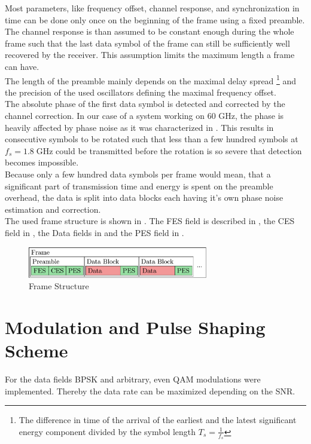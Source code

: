 Most parameters, like frequency offset, channel response, and
synchronization in time can be done only once on the beginning of the
frame using a fixed preamble.
The channel response is than assumed to be constant enough during
the whole frame such that the last data symbol of the frame can still be
sufficiently well recovered by the receiver.
This assumption limits the maximum length a frame can have. \\

The length of the preamble mainly depends on the maximal delay spread%
\footnote{The difference in time of the arrival of the earliest and the
  latest significant energy component divided by the symbol length
  $T_s = \frac{1}{f_s}$} and the precision of the used oscillators defining
the maximal frequency offset. \\

The absolute phase of the first data symbol is detected and corrected by the
channel correction. In our case of a system working on 60 GHz, the
phase is heavily affected by phase noise as it was characterized in
\cite{radoslav}. This results in consecutive symbols to be
rotated such that less than a few hundred symbols at $f_s = 1.8 \;\text{GHz}$
could be transmitted before the rotation is so severe that detection
becomes impossible. \\

Because only a few hundred data symbols per frame would mean,
that a significant part of transmission time and energy is spent
on the preamble overhead, the data is split into data blocks each having
it's own phase noise estimation and correction. \\

The used frame structure is shown in .
The \gls{FES} field is described in ,
the \gls{CES} field in ,
the Data fields in  and the
\gls{PES} field in .

\begin{figure}[ht]
  \centering
  \includegraphics[width=0.7\textwidth]{figures/frame_struct}
  \caption{Frame Structure}
  \label{fig:sys_frame_struct}
\end{figure}

\section{Modulation and Pulse Shaping Scheme}
For the data fields \gls{BPSK}  and arbitrary, even
\gls{QAM} modulations were implemented. Thereby the data rate
can be maximized depending on the \gls{SNR}. \\

